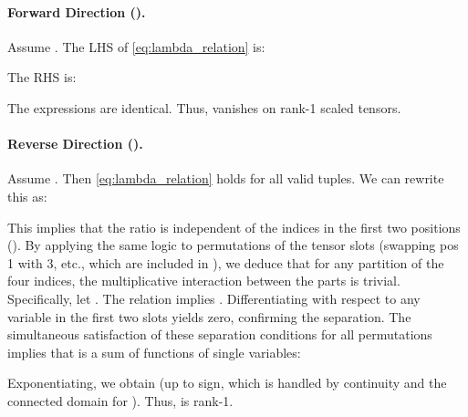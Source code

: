 \documentclass[12pt]{article}
\begin{document}
\paragraph{Forward Direction ().}
Assume . The LHS of \eqref{eq:lambda_relation} is:

The RHS is:

The expressions are identical. Thus,  vanishes on rank-1 scaled tensors.

\paragraph{Reverse Direction ().}
Assume . Then \eqref{eq:lambda_relation} holds for all valid tuples. We can rewrite this as:

This implies that the ratio  is independent of the indices in the first two positions (). By applying the same logic to permutations of the tensor slots (swapping pos 1 with 3, etc., which are included in ), we deduce that for any partition of the four indices, the multiplicative interaction between the parts is trivial.
Specifically, let . The relation implies .
Differentiating with respect to any variable in the first two slots yields zero, confirming the separation.
The simultaneous satisfaction of these separation conditions for all permutations implies that  is a sum of functions of single variables:



Exponentiating, we obtain  (up to sign, which is handled by continuity and the connected domain for ).
Thus,  is rank-1.
\end{document}
